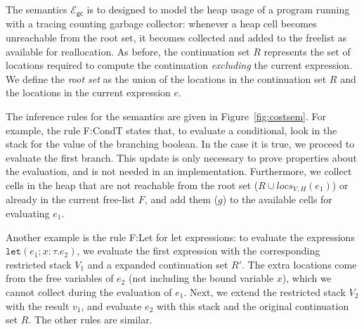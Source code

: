 \documentclass{easychair}
\newcommand{\ms}[1]{\ensuremath{\mathsf{#1}}}
\newcommand{\irl}[1]{\mathtt{#1}}
\newcounter{rule}
\newcommand{\gcSem}{\ensuremath{\mathcal{E}_{\ms{gc}}}}
\theoremstyle{definition}
\begin{document}
The semantics \gcSem{} is to designed to model the heap usage of a program running with a 
tracing counting garbage collector: whenever a heap cell becomes unreachable from the 
root set, it becomes collected and added to the freelist as available for reallocation.
As before, the continuation set $R$ represents the set of locations 
required to compute the continuation \emph{excluding} the current expression.
We define the  \emph{root set} as the union of the locations in the continuation set $R$ 
and the locations in the current expression $e$. 

The inference rules for the semantics are given in Figure~\ref{fig:costsem}.
For example, the rule F:CondT states that, to evaluate a conditional, 
look in the stack for the value of the branching boolean.
In the case it is true, we proceed to evaluate the first branch. This update is only necessary 
to prove properties about the evaluation, and is not needed in an implementation.
Furthermore, we collect cells in the heap
that are not reachable from the root set ($R \cup locs_{V,H}(e_1)$) 
or already in the current free-list
$F$, and add them ($g$) to the available cells for evaluating $e_1$. 

Another example is the rule F:Let for let expressions:
to evaluate the expressions $\irl{let}(e_1; x {:} \tau.e_2)$, we evaluate the first 
expression with the corresponding restricted stack $V_1$ and a expanded continuation set $R'$. 
The extra locations come from the free variables of $e_2$ (not including the bound variable $x$),
which we cannot collect during the evaluation of $e_1$. Next, we extend the restricted stack 
$V_2$ with the result $v_1$, and evaluate $e_2$ with this stack and the original continuation 
set $R$. The other rules are similar. 
\end{document}
